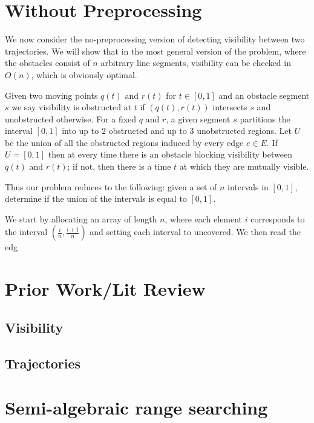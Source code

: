 \documentclass[a4paper, UKenglish]{paper}
\begin{document}
\newpage





\newpage
\appendix

\section{Without Preprocessing}
We now consider the no-preprocessing version of detecting visibility between two trajectories. We will show that in the most general version of the problem, where the obstacles consist of $n$ arbitrary line segments, visibility can be checked in $O(n)$, which is obviously optimal.

Given two moving points $q(t)$ and $r(t)$ for $t \in [0, 1]$ and an obstacle segment $s$ we say visibility is obstructed at $t$ if $(q(t), r(t))$ intersects $s$ and unobstructed otherwise. For a fixed $q$ and $r$, a given segment $s$ partitions the interval $[0, 1]$ into up to $2$ obstructed and up to $3$ unobstructed regions. Let $U$ be the union of all the obstructed regions induced by every edge $e \in E$. If $U = [0,1]$ then at every time there is an obstacle blocking visibility between $q(t)$ and $r(t)$; if not, then there is a time $t$ at which they are mutually visible.

Thus our problem reduces to the following: given a set of $n$ intervals in $[0,1]$, determine if the union of the intervals is equal to $[0,1]$.

We start by allocating an array of length $n$, where each element $i$ corresponds to the interval $(\frac{i}{n}, \frac{i+1}{n})$ and setting each interval to uncovered. We then read the edg


\section{Prior Work/Lit Review}
\subsection{Visibility}
\subsection{Trajectories}

\section{Semi-algebraic range searching}
\label{appx:rangesearch}
\end{document}
